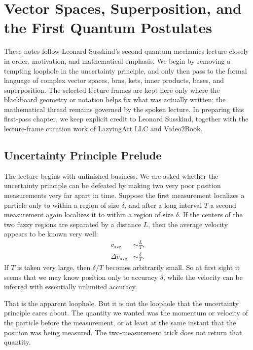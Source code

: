 \chapter{Vector Spaces, Superposition, and the First Quantum Postulates}

These notes follow Leonard Susskind's second quantum mechanics lecture closely in order, motivation, and mathematical emphasis. We begin by removing a tempting loophole in the uncertainty principle, and only then pass to the formal language of complex vector spaces, bras, kets, inner products, bases, and superposition. The selected lecture frames are kept here only where the blackboard geometry or notation helps fix what was actually written; the mathematical thread remains governed by the spoken lecture. In preparing this first-pass chapter, we keep explicit credit to Leonard Susskind, together with the lecture-frame curation work of LazyingArt LLC and Video2Book.

\section{Uncertainty Principle Prelude}

The lecture begins with unfinished business. We are asked whether the uncertainty principle can be defeated by making two very poor position measurements very far apart in time. Suppose the first measurement localizes a particle only to within a region of size \(\delta\), and after a long interval \(T\) a second measurement again localizes it to within a region of size \(\delta\). If the centers of the two fuzzy regions are separated by a distance \(L\), then the average velocity appears to be known very well:
\begin{align}
v_{\mathrm{avg}} &\sim \frac{L}{T},\\
\Delta v_{\mathrm{avg}} &\sim \frac{\delta}{T}.
\end{align}
If \(T\) is taken very large, then \(\delta/T\) becomes arbitrarily small. So at first sight it seems that we may know position only to accuracy \(\delta\), while the velocity can be inferred with essentially unlimited accuracy.

That is the apparent loophole. But it is not the loophole that the uncertainty principle cares about. The quantity we wanted was the momentum or velocity of the particle before the measurement, or at least at the same instant that the position was being measured. The two-measurement trick does not return that quantity.

